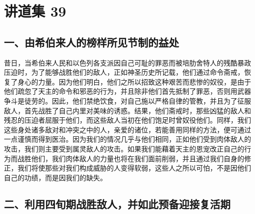 

\section{讲道集 39}

\par


\subsection{一、由希伯来人的榜样所见节制的益处}

昔日，当希伯来人民和以色列各支派因自己可耻的罪恶而被培肋舍特人的残酷暴政压迫时，为了能够战胜他们的敌人，正如神圣历史所记载，他们通过命令斋戒，恢复了身心的力量。因为他们明白，他们之所以招致这种艰苦而悲惨的奴役，是由于他们疏忽了天主的命令和邪恶的行为，并且除非他们首先抵制了罪恶，否则用武器争斗是徒劳的。因此，他们禁绝饮食，对自己施以严格自律的管教，并且为了征服敌人，首先战胜了自己内里对美味的诱惑。结果，他们斋戒时，那些凶猛的敌人和残忍的压迫者屈服于他们，而这些敌人当初在他们饱足时曾奴役他们。同样，我们这些身处诸多敌对和冲突之中的人，亲爱的诸位，若能善用同样的方法，便可通过一点谨慎而得到医治。因为我们的情况几乎与他们相同，正如他们受到肉体敌人的攻击，我们则主要受到属灵敌人的攻击。如果我们能藉着天主的恩宠改正自己的行为而战胜他们，我们肉体敌人的力量也将在我们面前削弱，并且通过我们自身的修正，我们将使那些对我们构成威胁的人变得软弱，这些人之所以可怕，不是因他们自己的功绩，而是因我们的缺失。\par


\subsection{二、利用四旬期战胜敌人，并如此预备迎接复活期}

